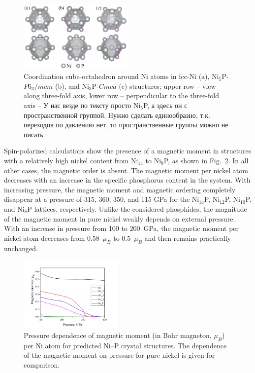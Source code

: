 \documentclass[twoside,twocolumn,9pt]{article}
\begin{document}
\begin{figure}
	\includegraphics[width=0.5\textwidth]{str_ss}
	\caption{Coordination cube-octahedron around Ni atoms in fcc-Ni (a), Ni$_5$P-$P6_3/mcm$ (b), and Ni$_3$P-$Cmca$ (c) structures; upper row – view along three-fold axis, lower row – perpendicular to the three-fold axis
{\color{red}
-- У нас везде по тексту просто Ni$_5$P, а здесь он с пространственной группой. Нужно сделать единообразно, т.к. переходов по давлению нет, то пространственные группы можно не писать
} }\label{f:strs}
\end{figure}


Spin-polarized calculations show the presence of a magnetic moment in structures with a relatively high nickel content from Ni$_{14}$ to Ni$_8$P, as shown in Fig.~\ref{fgr:magmom}. 
In all other cases, the magnetic order is absent. The magnetic moment per nickel atom decreases with an increase in the specific phosphorus content in the system. 
With increasing pressure, the magnetic moment and magnetic ordering completely disappear at a pressure of 315, 360, 350, and 115 GPa for the Ni$_{14}$P, Ni$_{12}$P, Ni$_{10}$P, and Ni$_8$P lattices, respectively. 
Unlike the considered phosphides, the magnitude of the magnetic moment in pure nickel weakly depends on external pressure. 
With an increase in pressure from 100 to 200~GPa, the magnetic moment per nickel atom decreases from 0.58~$\mu_B$ to 0.5~$\mu_B$ and then remains practically unchanged.

\begin{figure}[h]
\centering
  \includegraphics[width=0.45\textwidth]{magmom-uspex.jpg}
  \caption{Pressure dependence of magnetic moment (in Bohr magneton, $\mu_B$) per Ni atom for predicted Ni--P crystal structures.
  The dependence of the magnetic moment on pressure for pure nickel is given for comparison.
  }
  \label{fgr:magmom}
\end{figure}
\end{document}
